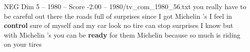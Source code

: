 \begin{textsample}{NEG Dim 5 – 1980 – Score -2.00 – 1980/tv\_com\_1980\_56.txt}  \label{ex:f5_neg_084}
you really have to be careful out there the roads full of surprises since I got Michelin 's I feel in \textbf{control} sure of myself and my car look no tire can stop surprises I know but with Michelin 's you can be \textbf{ready} for them Michelin because so much is riding on your tires

\end{textsample}
